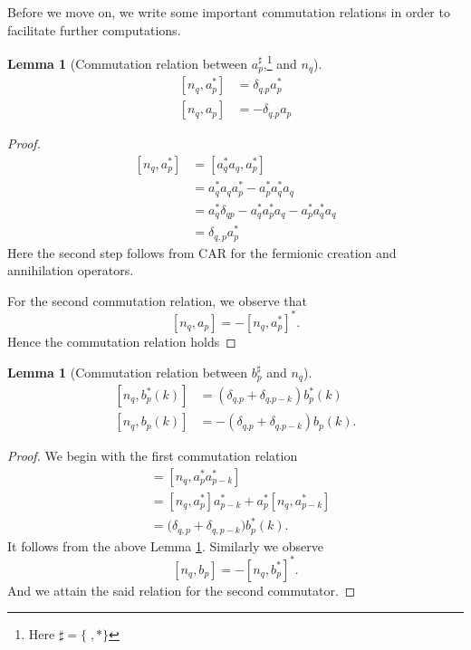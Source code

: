 \documentclass[sn-mathphys,Numbered, a4paper ,nocrop]{sn-jnl}%
\newcommand{\com}[1]{\left[ #1 \right]}
\theoremstyle{plain}
\newtheorem{lemma}[theorem]{Lemma}
\theoremstyle{definition}
\theoremstyle{remark}
\theoremstyle{plain}
\theoremstyle{definition}
\theoremstyle{remark}
\begin{document}
Before we move on, we write some important commutation relations in order to facilitate further computations.
\begin{lemma}[Commutation relation between $a^\sharp_p$,\footnote{Here $\sharp = \{\;,*\} $} and $n_q$]\label{lem:coman}
    \begin{align}
        \com{n_q,a^*_p} &= \delta_{q.p}a^*_p\\
        \com{n_q,a_p} &= -\delta_{q.p}a_p
    \end{align}
\end{lemma} 
\begin{proof}
    \begin{align}
        \com{n_q,a^*_p} &= \com{a^*_qa_q,a^*_p}\nonumber\\
        &=a^*_qa_qa^*_p - a^*_pa^*_qa_q\nonumber\\
        &= a^*_q\delta_{qp}- a^*_qa^*_pa_q - a^*_pa^*_qa_q\nonumber\\
        &=\delta_{q,p}a^*_p
    \end{align}
    Here the second step follows from CAR for the fermionic creation and annihilation operators.
    
For the second commutation relation, we observe that 
    \begin{equation}
        \com{n_q,a_p}= -\com{n_q,a^*_p}^*.
    \end{equation}
Hence the commutation relation holds
\end{proof}
\begin{lemma}[Commutation relation between $b^\sharp_p$ and $n_q$]
    \begin{align}
        \com{n_q,b^*_p(k)} &= \left(\delta_{q.p}+\delta_{q.p-k}\right)b^*_p(k)\\
        \com{n_q,b_p(k)} &= -\left(\delta_{q.p}+\delta_{q.p-k}\right)b_p(k).
    \end{align}
\end{lemma} 
\begin{proof} We begin with the first commutation relation
    \begin{align}
        [n_q,b^*_p(k)] &= [n_q,a^*_pa^*_{p-k}]\\
        &=[n_q,a^*_p]a^*_{p-k}+a^*_p[n_q,a^*_{p-k}]\\
        &=\big(\delta_{q,p} +\delta_{q,p-k}\big)b^*_p(k).
    \end{align}
    It follows from the above Lemma \ref{lem:coman}. Similarly we observe
    \begin{equation}
         \com{n_q,b_p}= -\com{n_q,b^*_p}^*.
    \end{equation}
    And we attain the said relation for the second commutator.
\end{proof}
\end{document}
